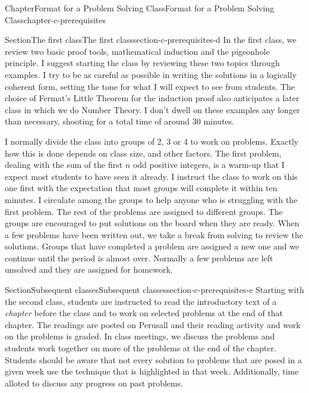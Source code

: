 \documentclass[oneside,10pt,]{book}
\numberwithin{equation}{section}
\begin{document}
\begin{chapterptx}{Chapter}{Format for a Problem Solving Class}{}{Format for a Problem Solving Class}{}{}{chapter-c-prerequisites}
\typeout{************************************************}
%
\begin{sectionptx}{Section}{The first class}{}{The first class}{}{}{section-c-prerequisites-d}
In the first class, we review two basic proof tools, mathematical induction and the pigeonhole principle. I suggest starting the class by reviewing these two topics through examples.  I try to be as careful as possible in writing the solutions in a logically coherent form, setting the tone for what I will expect to see from students.   The choice of Fermat's Little Theorem for the induction proof also anticipates a later class in which we do Number Theory.  I don't dwell on these examples any longer than necessary, shooting for a total time of around 30 minutes.%
\par
I normally divide the class into groups of 2, 3 or 4 to work on problems.  Exactly how this is done depends on class size, and other factors.   The first problem, dealing with the sum of the first \(n\) odd positive integers, is a warm-up that I expect most students to have seen it already.  I instruct the class to work on this one first with the expectation that most groups will complete it within ten minutes.   I circulate among the groups to help anyone who is struggling with the first problem.   The rest of the problems are assigned to different groups.  The groups are encouraged to put solutions on the board when they are ready.  When a few problems have been written out, we take a break from solving to review the solutions. Groups that have completed a problem are assigned a new one and we continue until the period is almost over.  Normally a few problems are left unsolved and they are assigned for homework.%
\end{sectionptx}
%
%
\typeout{************************************************}
\typeout{************************************************}
%
\begin{sectionptx}{Section}{Subsequent classes}{}{Subsequent classes}{}{}{section-c-prerequisites-e}
Starting with the second class, students are instructed to read the introductory text of a \emph{chapter} before the class and to work on selected problems at the end of that chapter.  The readings are posted on Perusall and their reading activity and work on the problems is graded.   In class meetings, we discuss the problems and students work together on more of the problems at the end of the chapter.  Students should be aware that not every solution to problems that are posed in a given week use the technique that is highlighted in that week. Additionally, time alloted to discuss any progress on past problems.%

\end{sectionptx}
\end{chapterptx}
\end{document}
